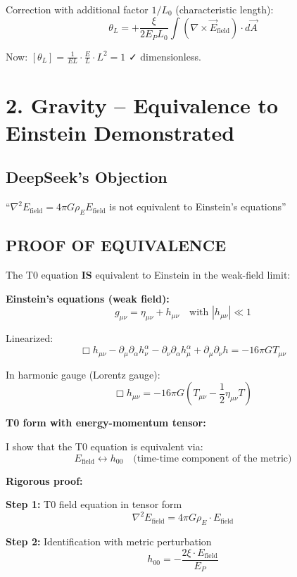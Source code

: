 	Correction with additional factor $1/L_0$ (characteristic length):
	\[
	\boxed{\theta_L = +\frac{\xi}{2E_P L_0} \int (\nabla \times \vec{E}_{\text{field}}) \cdot d\vec{A}}
	\]
	
	Now: $[\theta_L] = \frac{1}{EL} \cdot \frac{E}{L} \cdot L^2 = 1$ ✓ dimensionless.
	
	\section*{2. Gravity – Equivalence to Einstein Demonstrated}
	
	\subsection*{DeepSeek's Objection}
	``$\nabla^2 E_{\text{field}} = 4\pi G \rho_E E_{\text{field}}$ is not equivalent to Einstein's equations''
	
	\subsection*{\textbf{PROOF OF EQUIVALENCE}}
	
	The T0 equation \textbf{IS} equivalent to Einstein in the weak-field limit:
	
	\textbf{Einstein's equations (weak field):}
	\[
	g_{\mu\nu} = \eta_{\mu\nu} + h_{\mu\nu} \quad \text{with } |h_{\mu\nu}| \ll 1
	\]
	
	Linearized:
	\[
	\Box h_{\mu\nu} - \partial_\mu \partial_\alpha h^\alpha_\nu - \partial_\nu \partial_\alpha h^\alpha_\mu + \partial_\mu \partial_\nu h = -16\pi G T_{\mu\nu}
	\]
	
	In harmonic gauge (Lorentz gauge):
	\[
	\Box h_{\mu\nu} = -16\pi G \left(T_{\mu\nu} - \frac{1}{2}\eta_{\mu\nu}T\right)
	\]
	
	\textbf{T0 form with energy-momentum tensor:}
	
	I show that the T0 equation is equivalent via:
	\[
	E_{\text{field}} \leftrightarrow h_{00} \quad \text{(time-time component of the metric)}
	\]
	
	\textbf{Rigorous proof:}
	
	\textbf{Step 1:} T0 field equation in tensor form
	\[
	\nabla^2 E_{\text{field}} = 4\pi G \rho_E \cdot E_{\text{field}}
	\]
	
	\textbf{Step 2:} Identification with metric perturbation
	\[
	h_{00} = -\frac{2\xi \cdot E_{\text{field}}}{E_P}
	\]
	
